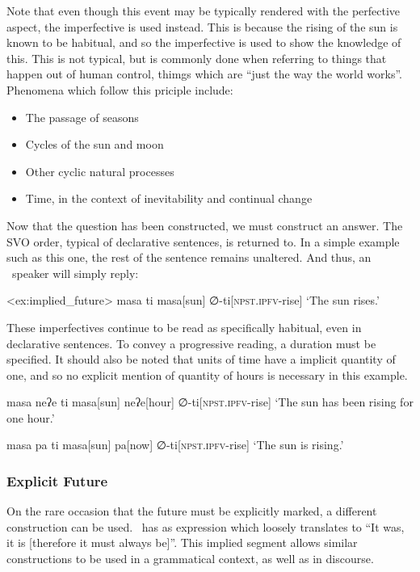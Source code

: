Note that even though this event may be typically rendered with the perfective aspect, the imperfective is used instead. This is because the rising of the sun is known to be habitual, and so the imperfective is used to show the knowledge of this. This is not typical, but is commonly done when referring to things that happen out of human control, thimgs which are ``just the way the world works''. Phenomena which follow this priciple include:

\begin{itemize}
  \item The passage of seasons
  \item Cycles of the sun and moon
  \item Other cyclic natural processes
  \item Time, in the context of inevitability and continual change
\end{itemize}

Now that the question has been constructed, we must construct an answer. The SVO order, typical of declarative sentences, is returned to. In a simple example such as this one, the rest of the sentence remains unaltered. And thus, an \langname\ speaker will simply reply:

\ex<ex:implied_future>
\begingl
\glpreamble masa ti
\endpreamble
masa[sun] ∅-ti[\textsc{npst.ipfv-}rise]
\glft `The sun rises.'
\endgl
\xe

These imperfectives continue to be read as specifically habitual, even in declarative sentences. To convey a progressive reading, a duration must be specified.
It should also be noted that units of time have a implicit quantity of one, and so no explicit mention of quantity of hours is necessary in this example.

\ex
\begingl
\glpreamble masa neʔe ti
\endpreamble
masa[sun]
neʔe[hour]
∅-ti[\textsc{npst.ipfv-}rise]
\glft `The sun has been rising for one hour.'
\endgl
\xe

\ex
\begingl
\glpreamble masa pa ti
\endpreamble
masa[sun]
pa[now]
∅-ti[\textsc{npst.ipfv-}rise]
\glft `The sun is rising.'
\endgl
\xe

\subsubsection{Explicit Future}
On the rare occasion that the future must be explicitly marked, a different construction can be used. \langname\ has as expression which loosely translates to ``It was, it is [therefore it must always be]''. This implied segment allows similar constructions to be used in a grammatical context, as well as in discourse.

